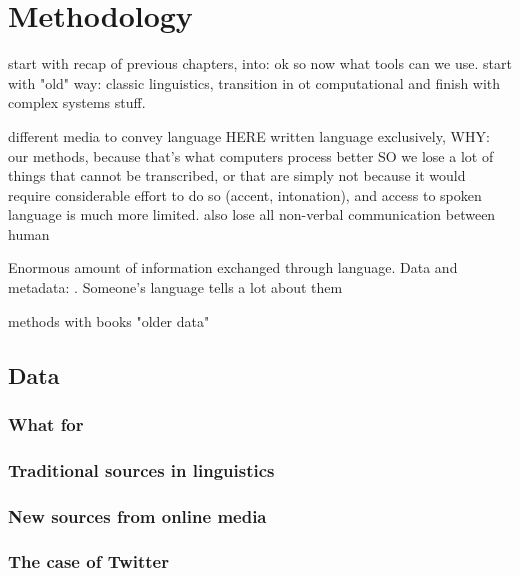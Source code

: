 \documentclass[../thesis.tex]{subfiles}
\begin{document}
\chapter{Methodology}
\label{ch:methods}

start with recap of previous chapters, into: ok so now what tools can we use. start with "old" way: classic linguistics, transition in ot computational and finish with complex systems stuff.
\cite{NguyenComputationalSociolinguistics2016}

different media to convey language
HERE written language exclusively, WHY: our methods, because that's what computers process better
SO we lose a lot of things that cannot be transcribed, or that are simply not because it would require considerable effort to do so  (accent, intonation), and access to spoken language is much more limited. also lose all non-verbal communication between human


Enormous amount of information exchanged through language. Data and metadata: . Someone's language tells a lot about them

methods with books "older data"


\section{Data}

\subsection{What for}

\subsection{Traditional sources in linguistics}

\subsection{New sources from online media}

\subsection{The case of Twitter}
\end{document}
